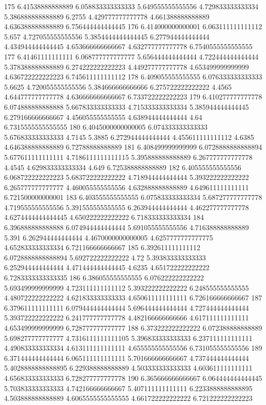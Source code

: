 175 6.41538888888889 6.058833333333333 5.649555555555556 4.729833333333334 5.386888888888889 6.2755 4.429777777777778 4.661388888888889 4.636388888888889 6.756444444444445
176 6.414000000000001 6.063111111111112 5.657 4.727055555555556 5.3854444444444445 6.277944444444444 4.434944444444445 4.653666666666667 4.632777777777778 6.7540555555555555
177 6.41461111111111 6.068777777777777 5.656444444444444 4.722444444444444 5.378388888888889 6.274222222222223 4.449277777777778 4.653499999999999 4.636722222222223 6.745611111111112
178 6.409055555555555 6.076333333333333 5.6625 4.720055555555556 5.384666666666666 6.275722222222222 4.4565 4.644777777777778 4.636666666666667 6.733722222222223
179 6.410277777777778 6.074888888888888 5.667833333333333 4.715333333333334 5.385944444444445 6.279166666666667 4.456055555555555 4.638944444444444 4.64 6.7315555555555555
180 6.4045000000000005 6.074333333333333 5.676833333333333 4.7145 5.3885 6.272944444444444 4.455611111111112 4.6385 4.646388888888889 6.72788888888889
181 6.408499999999999 6.0728888888888894 5.677611111111111 4.7186111111111115 5.395888888888889 6.267777777777778 4.4545 4.629833333333334 4.649 6.725388888888889
182 6.405555555555556 6.068722222222223 5.683722222222222 4.718944444444444 5.393222222222222 6.265777777777777 4.460055555555556 4.632888888888889 4.649611111111111 6.721500000000001
183 6.403555555555555 6.075833333333334 5.687277777777778 4.719555555555556 5.391555555555555 6.263944444444444 4.462277777777778 4.6274444444444445 4.650222222222222 6.718333333333334
184 6.396888888888888 6.074944444444444 5.691055555555556 4.716388888888889 5.391 6.262944444444444 4.4670000000000005 4.6257777777777775 4.652833333333334 6.721166666666667
185 6.392611111111112 6.0728888888888894 5.692722222222222 4.72 5.393833333333333 6.252944444444444 4.471444444444445 4.6235 4.651722222222222 6.7283333333333335
186 6.386055555555555 6.076222222222222 5.693499999999999 4.723111111111112 5.393222222222222 6.248555555555555 4.480722222222222 4.621833333333333 4.650611111111111 6.726166666666667
187 6.379611111111111 6.079444444444444 5.696444444444444 4.727444444444444 5.393722222222222 6.241777777777778 4.482166666666666 4.617111111111111 4.653499999999999 6.728777777777777
188 6.373222222222222 6.072388888888889 5.698277777777777 4.7316111111111105 5.396833333333333 6.237111111111111 4.490833333333334 4.613111111111111 4.655555555555556 6.731055555555556
189 6.371444444444444 6.065111111111111 5.701666666666667 4.737444444444444 5.4028888888888895 6.229388888888889 4.503333333333333 4.603611111111111 4.656833333333333 6.728277777777778
190 6.365666666666667 6.064444444444445 5.703833333333333 4.742166666666667 5.407111111111111 6.2233888888888895 4.503888888888889 4.6065555555555555 4.661722222222222 6.721222222222223